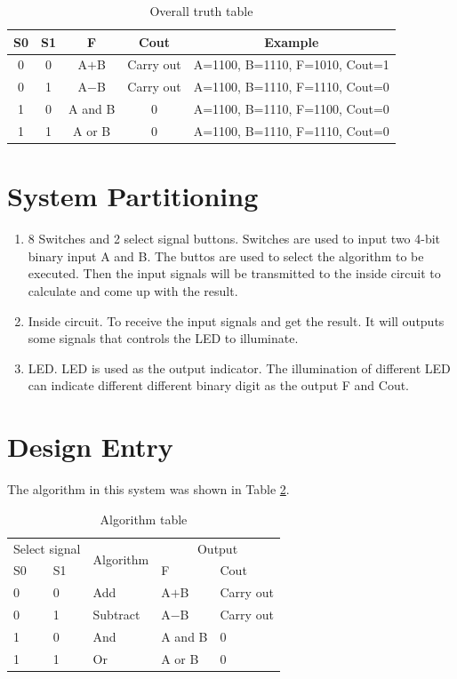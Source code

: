 \documentclass{article}
\begin{document}
\begin{table}[!hbtp]
\centering
\begin{tabular}{|c|c|c|c|c|}
\hline
S0 & S1 & F & Cout & Example \\\hline
0 & 0 & A$+$B & Carry out & A=1100, B=1110, F=1010, Cout=1 \\\hline
0 & 1 & A$-$B & Carry out & A=1100, B=1110, F=1110, Cout=0 \\\hline
1 & 0 & A and B & 0 & A=1100, B=1110, F=1100, Cout=0 \\\hline
1 & 1 & A or B & 0 & A=1100, B=1110, F=1110, Cout=0 \\\hline
\end{tabular}
\caption{Overall truth table}
\label{def-table}
\end{table}

\section{System Partitioning}
\begin{enumerate}
\item 8 Switches and 2 select signal buttons. Switches are used to input two 4-bit binary input A and B. The buttos are used to select the algorithm to be executed. Then the input signals will be transmitted to the inside circuit to calculate and come up with the result.
\item Inside circuit. To receive the input signals and get the result. It will outputs some signals that controls the LED to illuminate.
\item LED. LED is used as the output indicator. The illumination of different LED can indicate different different binary digit as the output F and Cout.
\end{enumerate}

\section{Design Entry}
The algorithm in this system was shown in Table \ref{algorithm-table}.

\begin{table}[!hbtp]
\centering
\begin{tabular}{|p{2cm}<{\centering}|p{2cm}<{\centering}|p{2cm}<{\centering}|p{2cm}<{\centering}|p{2cm}<{\centering}|}
\hline
\multicolumn{2}{|c|}{Select signal} & \multirow{2}{*}{Algorithm} & \multicolumn{2}{c|}{Output} \\\cline{1-2}\cline{4-5}
S0 & S1 & & F & Cout  \\\hline
0 & 0 & Add & A$+$B & Carry out  \\\hline
0 & 1 & Subtract & A$-$B & Carry out  \\\hline
1 & 0 & And & A and B & 0  \\\hline
1 & 1 & Or & A or B & 0  \\\hline
\end{tabular}
\caption{Algorithm table}
\label{algorithm-table}
\end{table}
\end{document}
